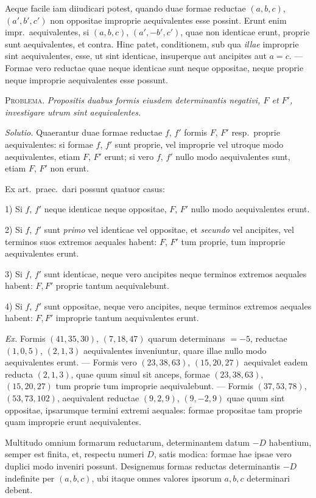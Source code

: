 Aeque facile iam diiudicari potest, quando duae formae reductae $(a,b,c)$, $(a',b',c')$ non oppositae improprie aequivalentes esse possint. Erunt enim impr.\ aequivalentes, si $(a,b,c)$, $(a',-b',c')$, quae non identicae erunt, proprie sunt aequivalentes, et contra. Hinc patet, conditionem, sub qua \emph{illae} improprie sint aequivalentes, esse, ut sint identicae, insuperque aut ancipites aut $a=c$. --- Formae vero reductae quae neque identicae sunt neque oppositae, neque proprie neque improprie aequivalentes esse possunt.

\textsc{Problema.} \emph{Propositis duabus formis eiusdem determinantis negativi, $F$ et $F'$, investigare utrum sint aequivalentes.}

\emph{Solutio.} Quaerantur duae formae reductae $f$, $f'$ formis $F$, $F'$ resp.\ proprie aequivalentes: si formae $f$, $f'$ sunt proprie, vel improprie vel utroque modo aequivalentes, etiam $F$, $F'$ erunt; si vero $f$, $f'$ nullo modo aequivalentes sunt, etiam $F$, $F'$ non erunt.

Ex art.\ praec.\ dari possunt quatuor casus:

1) Si $f$, $f'$ neque identicae neque oppositae, $F$, $F'$ nullo modo aequivalentes erunt.

2) Si $f$, $f'$ sunt \emph{primo} vel identicae vel oppositae, et \emph{secundo} vel ancipites, vel terminos suos extremos aequales habent: $F$, $F'$ tum proprie, tum improprie aequivalentes erunt.

3) Si $f$, $f'$ sunt identicae, neque vero ancipites neque terminos extremos aequales habent: $F,F'$ proprie tantum aequivalebunt.

4) Si $f$, $f'$ sunt oppositae, neque vero ancipites, neque terminos extremos aequales habent: $F,F'$ improprie tantum aequivalentes erunt.

\emph{Ex.} Formis $(41,35,30)$, $(7,18,47)$ quarum determinans $=-5$, reductae $(1,0,5)$, $(2,1,3)$ aequivalentes inveniuntur, quare illae nullo modo aequivalentes erunt. --- Formis vero $(23,38,63)$, $(15,20,27)$ aequivalet eadem
reducta $(2,1,3)$, quae quum simul sit anceps, formae $(23,38,63)$, $(15,20,27)$ tum proprie tum improprie aequivalebunt. --- Formis $(37,53,78)$, $(53,73,102)$, aequivalent reductae $(9,2,9)$, $(9,-2,9)$ quae quum sint oppositae, ipsarumque termini extremi aequales: formae propositae tam proprie quam improprie erunt aequivalentes.

Multitudo omnium formarum reductarum, determinantem datum $-D$ habentium, semper est finita, et, respectu numeri $D$, satis modica: formae hae ipsae vero duplici modo inveniri possunt. Designemus formas reductas determinantis $-D$ indefinite per $(a,b,c)$, ubi itaque omnes valores ipsorum $a,b,c$ determinari debent.

